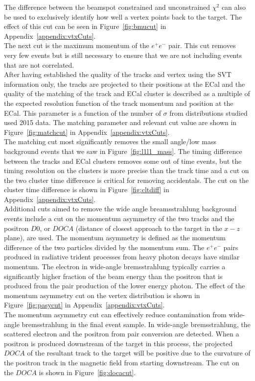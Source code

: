 The difference between the beamspot constrained and unconstrained $\chi^2$ can also be used to exclusively identify how well a vertex points back to the target. The effect of this cut can be seen in Figure~\ref{fig:bmucut} in Appendix~\ref{appendix:vtxCuts}.\\
\indent The next cut is the maximum momentum of the $e^+e^-$ pair. This cut removes very few events but is still necessary to ensure that we are not including events that are not correlated. \\
\indent After having established the quality of the tracks and vertex using the SVT information only, the tracks are projected to their positions at the ECal and the quality of the matching of the track and ECal cluster is described as a multiple of the expected resolution function of the track momentum and position at the ECal. This parameter is a function of the number of $\sigma$ from distributions studied used 2015 data. The matching parameter and relevant cut value are shown in Figure~\ref{fig:matchcut} in Appendix~\ref{appendix:vtxCuts}. \\
\indent The matching cut most significantly removes the small angle/low mass background events that we saw in Figure~\ref{fig:l1l1_mass}. The timing difference between the tracks and ECal clusters removes some out of time events, but the timing resolution on the clusters is more precise than the track time and a cut on the two cluster time difference is critical for removing accidentals. The cut on the cluster time difference is shown in Figure~\ref{fig:cltdiff} in Appendix~\ref{appendix:vtxCuts}.\\
\indent Additional cuts aimed to remove the wide angle breamsstrahlung background events include a cut on the momentum asymmetry of the two tracks and the positron $D0$, or $DOCA$ (distance of closest approach to the target in the $x-z$ plane), are used. The momentum asymmetry is defined as the momentum difference of the two particles divided by the momentum sum. The $e^+e^-$ pairs produced in radiative trident processes from heavy photon decays have similar momentum. The electron in wide-angle bremsstrahlung typically carries a significantly higher fraction of the beam energy than the positron that is produced from the pair production of the lower energy photon. The effect of the momentum asymmetry cut on the vertex distribution is shown in Figure~\ref{fig:pasycut} in Appendix~\ref{appendix:vtxCuts}.\\
\indent The momentum asymmetry cut can effectively reduce contamination from wide-angle bremsstrahlung in the final event sample. In wide-angle bremsstrahlung, the scattered electron and the positron from pair conversion are detected. When a positron is produced downstream of the target in this process, the projected $DOCA$ of the resultant track to the target will be positive due to the curvature of the positron track in the magnetic field from starting downstream. The cut on the $DOCA$ is shown in Figure~\ref{fig:docacut}. 

